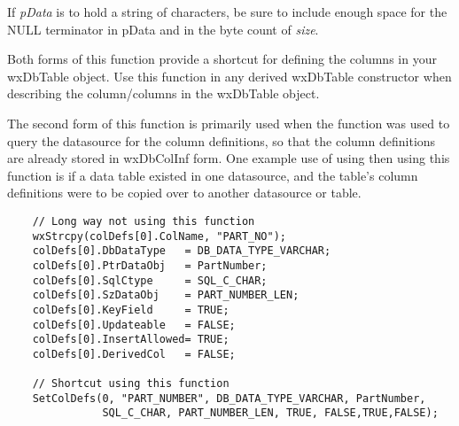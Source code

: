 

If {\it pData} is to hold a string of characters, be sure to include enough
space for the NULL terminator in pData and in the byte count of {\it size}.

Both forms of this function provide a shortcut for defining the columns in
your wxDbTable object.  Use this function in any derived wxDbTable
constructor when describing the column/columns in the wxDbTable object.

The second form of this function is primarily used when the
 function was used to query the
datasource for the column definitions, so that the column definitions are
already stored in wxDbColInf form.  One example use of using
 then using this function is if
a data table existed in one datasource, and the table's column definitions
were to be copied over to another datasource or table.


\begin{verbatim}
    // Long way not using this function
    wxStrcpy(colDefs[0].ColName, "PART_NO");
    colDefs[0].DbDataType   = DB_DATA_TYPE_VARCHAR;
    colDefs[0].PtrDataObj   = PartNumber;
    colDefs[0].SqlCtype     = SQL_C_CHAR;
    colDefs[0].SzDataObj    = PART_NUMBER_LEN;
    colDefs[0].KeyField     = TRUE;
    colDefs[0].Updateable   = FALSE;
    colDefs[0].InsertAllowed= TRUE;
    colDefs[0].DerivedCol   = FALSE;

    // Shortcut using this function
    SetColDefs(0, "PART_NUMBER", DB_DATA_TYPE_VARCHAR, PartNumber,
               SQL_C_CHAR, PART_NUMBER_LEN, TRUE, FALSE,TRUE,FALSE);
\end{verbatim}

\label{wxdbtablesetcursor}




